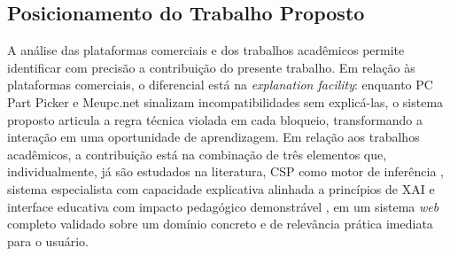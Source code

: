 \subsection{Posicionamento do Trabalho Proposto}
A análise das plataformas comerciais e dos trabalhos acadêmicos permite identificar com precisão a contribuição do presente
trabalho. Em relação às plataformas comerciais, o diferencial está na \textit{explanation facility}: enquanto PC Part Picker
e Meupc.net sinalizam incompatibilidades sem explicá-las, o sistema proposto articula a regra técnica violada em cada bloqueio,
transformando a interação em uma oportunidade de aprendizagem. Em relação aos trabalhos acadêmicos, a contribuição está na combinação
de três elementos que, individualmente, já são estudados na literatura, CSP como motor de inferência \cite{Sabin1998}, sistema
especialista com capacidade explicativa alinhada a princípios de XAI \cite{Clancey1983,Arrieta2020} e interface educativa
com impacto pedagógico demonstrável \cite{Wang2018}, em um sistema \textit{web} completo validado sobre um domínio concreto
e de relevância prática imediata para o usuário.










